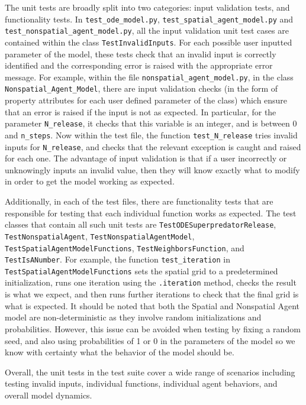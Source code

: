 \documentclass[journal]{IEEEtran}
\begin{document}
The unit tests are broadly split into two categories: input validation tests, and functionality tests.
In \verb|test_ode_model.py|, \verb|test_spatial_agent_model.py| and \verb|test_nonspatial_agent_model.py|, all the input validation unit test cases are contained within the class \verb|TestInvalidInputs|. For each possible user inputted parameter of the model, these tests check that an invalid input is correctly identified and the corresponding error is raised with the appropriate error message. For example, within the file \verb|nonspatial_agent_model.py|, in the class \verb|Nonspatial_Agent_Model|, there are input validation checks (in the form of property attributes for each user defined parameter of the class) which ensure that an error is raised if the input is not as expected. In particular, for the parameter \verb|N_release|, it checks that this variable is an integer, and is between 0 and \verb|n_steps|. Now within the test file, the function \verb|test_N_release| tries invalid inputs for \verb|N_release|, and checks that the relevant exception is caught and raised for each one. The advantage of input validation is that if a user incorrectly or unknowingly inputs an invalid value, then they will know exactly what to modify in order to get the model working as expected.

Additionally, in each of the test files, there are functionality tests that are responsible for testing that each individual function works as expected. The test classes that contain all such unit tests are \verb|TestODESuperpredatorRelease|, \verb|TestNonspatialAgent|, \verb|TestNonspatialAgentModel|, \verb|TestSpatialAgentModelFunctions|, \verb|TestNeighborsFunction|, and \verb|TestIsANumber|. 
For example, the function \verb|test_iteration| in \verb|TestSpatialAgentModelFunctions| sets the spatial grid to a predetermined initialization, runs one iteration using the \verb|.iteration| method, checks the result is what we expect, and then runs further iterations to check that the final grid is what is expected. It should be noted that both the Spatial and Nonspatial Agent model are non-deterministic as they involve random initializations and probabilities. However, this issue can be avoided when testing by fixing a random seed, and also using probabilities of 1 or 0 in the parameters of the model so we know with certainty what the behavior of the model should be.

Overall, the unit tests in the test suite cover a wide range of scenarios including testing invalid inputs, individual functions, individual agent behaviors, and overall model dynamics.
\end{document}
